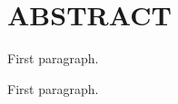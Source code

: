 \newpage
\section*{ABSTRACT}
\begin{singlespace}
\par
First paragraph.
\par
First paragraph.
\end{singlespace}
